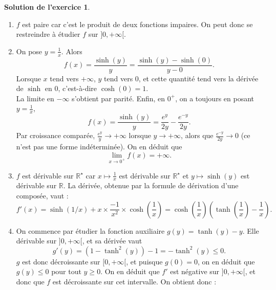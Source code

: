 \documentclass[a4paper, 11pt,openany]{article}%
\theoremstyle{plain}
\theoremstyle{definition}
\newtheorem{sol}{Solution de l'exercice}
\theoremstyle{remark}
\newcommand{\R}{\mathbb{R}}
\begin{document}
\begin{sol}
\begin{enumerate}
\item $f$ est paire car c'est le produit de deux fonctions impaires. On peut donc se restreindre à étudier $f$ sur $]0,+\infty[$.
\item On pose $y= \frac{1}{x}$. Alors 
\[ f(x)= \frac{\sinh(y)}{y} = \frac{\sinh(y)-\sinh(0)}{y-0}.\]
Lorsque $x$ tend vers $+\infty$, $y$ tend vers $0$, et cette quantité tend vers la dérivée de $\sinh$ en $0$, c'est-à-dire $\cosh(0)=1$.\\
La limite en $-\infty$ s'obtient par parité. Enfin, en $0^+$, on a toujours en posant $y = \frac{1}{x}$,
\[ f(x)=\frac{\sinh(y)}{y}= \frac{e^y}{2y}-\frac{e^{-y}}{2y}.\]
Par croissance comparée, $\frac{e^y}{y} \to + \infty$ lorsque $y \to +\infty$, alors que $\frac{e^{-y}}{2y} \to 0$ (ce n'est pas une forme indéterminée). On en déduit que \[ \lim_{x \to 0^+} f(x) = + \infty.\]
\item $f$ est dérivable sur $\R^{\star}$ car $x \mapsto \frac{1}{x}$ est dérivable sur $\R^{\star}$ et $y \mapsto \sinh(y)$ est dérivable sur $\R$. La dérivée, obtenue par la formule de dérivation d'une composée, vaut :
\[ f'(x)=\sinh(1/x)+x \times \frac{-1}{x^2} \times \cosh\left( \frac{1}{x} \right) = \cosh\left( \frac{1}{x} \right)\left(  \tanh\left( \frac{1}{x} \right)-\frac{1}{x} \right).\]
\item On commence par étudier la fonction auxiliaire $g(y)=\tanh(y)-y$. Elle dérivable sur $]0,+\infty[$, et sa dérivée vaut 
\[ g'(y)=(1-\tanh^2(y))-1=-\tanh^2(y) \leqslant 0.\]
$g$ est donc décroissante sur $[0,+\infty[$, et puisque $g(0)=0$, on en déduit que $g(y) \leqslant 0$ pour tout $y\geqslant 0$. On en déduit que $f'$ est négative sur $]0,+\infty[$, et donc que $f$ est décroissante sur cet intervalle. On obtient donc :
\begin{center}
    \end{center}
\end{enumerate}
\end{sol}
\end{document}
